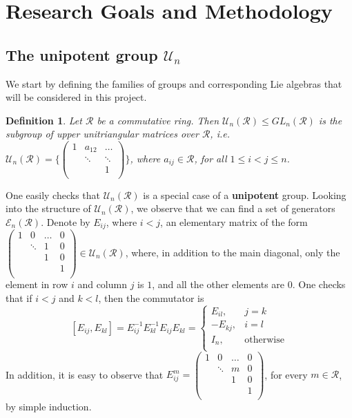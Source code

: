 \documentclass[12pt]{article}
\newtheorem{definition}[theorem]{Definition}
\begin{document}
\section{Research Goals and Methodology}
\subsection{The unipotent group $\mathcal{U}_n$}
We start by defining the families of groups and corresponding Lie algebras that will be considered in this project.
\begin{definition}
\label{def.unipotent.matrix}
Let $\mathcal{R}$ be a commutative ring. Then $\mathcal{U}_n(\mathcal{R})\leq GL_n(\mathcal{R})$ is the subgroup of upper unitriangular matrices over $\mathcal{R}$, i.e. $\mathcal{U}_n(\mathcal{R})=\Bigg\{
\begin{pmatrix}
1 & a_{12} &\dots\\
  & \ddots & \ddots\\
  & & 1\\
\end{pmatrix}\Bigg\}$, where $a_{ij}\in\mathcal{R}$, for all $1\leq i<j\leq n$.
\end{definition}
 One easily checks that $\mathcal{U}_n(\mathcal{R})$ is a special case of a \textbf{unipotent} group.
Looking into the structure of $\mathcal{U}_n(\mathcal{R})$, we observe that we can find a set of generators $\mathcal{E}_n(\mathcal{R})$. Denote by $E_{ij}$, where $i<j$, an elementary matrix of the form $\begin{pmatrix}
1 & 0 & \dots & 0\\
  & \ddots & 1 & 0\\
  &  & 1 & 0\\
  & & & 1\\
  \end{pmatrix}\in \mathcal{U}_n(\mathcal{R})$, where, in addition to the main diagonal, only the element in row $i$ and column $j$ is $1$, and all the other elements are $0$. One checks that if $i<j$ and $k<l$, then the commutator is \[
  [E_{ij},E_{kl}]=E_{ij}^{-1}E_{kl}^{-1}E_{ij}E_{kl}=\begin{cases}
    E_{il}, & j=k\\
    -E_{kj}, & {i=l}\\
    I_n, & \text{otherwise}\\
    \end{cases}
    \]
  In addition, it is easy to observe that $E_{ij}^m=\begin{pmatrix}
1 & 0 & \dots & 0\\
  & \ddots & m & 0\\
  &  & 1 & 0\\
  & & & 1\\
  \end{pmatrix}$, for every $m\in\mathcal{R}$, by simple induction.
\end{document}
